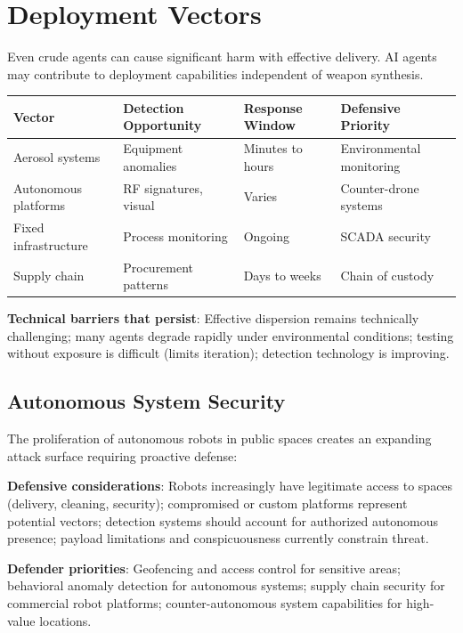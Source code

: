 \documentclass[11pt,letterpaper]{article}
\begin{document}
\section{Deployment Vectors}

Even crude agents can cause significant harm with effective delivery. AI agents may contribute to deployment capabilities independent of weapon synthesis.

\begin{center}
\small
\begin{tabular}{L{3cm}L{3.5cm}L{2.5cm}L{3cm}}
\toprule
\textbf{Vector} & \textbf{Detection Opportunity} & \textbf{Response Window} & \textbf{Defensive Priority} \\
\midrule
Aerosol systems & Equipment anomalies & Minutes to hours & Environmental monitoring \\
Autonomous platforms & RF signatures, visual & Varies & Counter-drone systems \\
Fixed infrastructure & Process monitoring & Ongoing & SCADA security \\
Supply chain & Procurement patterns & Days to weeks & Chain of custody \\
\bottomrule
\end{tabular}
\end{center}

\textbf{Technical barriers that persist}: Effective dispersion remains technically challenging; many agents degrade rapidly under environmental conditions; testing without exposure is difficult (limits iteration); detection technology is improving.

\subsection{Autonomous System Security}

The proliferation of autonomous robots in public spaces creates an expanding attack surface requiring proactive defense:

\textbf{Defensive considerations}: Robots increasingly have legitimate access to spaces (delivery, cleaning, security); compromised or custom platforms represent potential vectors; detection systems should account for authorized autonomous presence; payload limitations and conspicuousness currently constrain threat.

\textbf{Defender priorities}: Geofencing and access control for sensitive areas; behavioral anomaly detection for autonomous systems; supply chain security for commercial robot platforms; counter-autonomous system capabilities for high-value locations.
\end{document}
